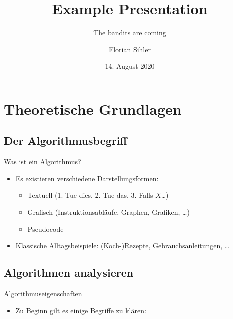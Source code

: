 \documentclass[aspectratio=169,usepdftitle=true,handout]{beamer}
\title{Example Presentation}
\subtitle{The bandits are coming}
\date[14.08.2020]{14. August 2020}
\author[F.~Sihler]{Florian Sihler}
\begin{document}
\titleframe
\section{Theoretische Grundlagen}
\subsection{Der Algorithmusbegriff}
\begin{frame}{Was ist ein Algorithmus?}
    \begin{itemize}
        \item Es existieren verschiedene Darstellungsformen: \begin{itemize}
            \item Textuell (1. Tue dies, 2. Tue das, 3. Falls \(X\)\ldots)
            \item Grafisch (Instruktionsabläufe, Graphen, Grafiken, \ldots)
            \item Pseudocode
        \end{itemize}
        \item Klassische Alltagsbeispiele: (Koch-)Rezepte, Gebrauchsanleitungen, \ldots
    \end{itemize}
\end{frame}

\subsection{Algorithmen analysieren}
\begin{frame}{Algorithmuseigenschaften}
    \begin{itemize}[<+(1)->]
        \item Zu Beginn gilt es einige Begriffe zu klären: 
    \end{itemize}
\end{frame}
\end{document}
